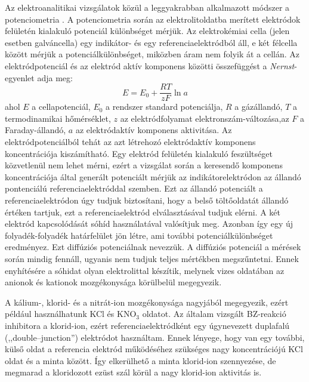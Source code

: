 Az elektroanalitikai vizsgálatok közül a leggyakrabban alkalmazott módszer a potenciometria \cite{erdey1967}. A potenciometria során az elektrolitoldatba merített elektródok felületén kialakuló potenciál különbséget mérjük. Az elektrokémiai cella (jelen esetben galváncella) egy indikátor- és egy referenciaelektródból áll, e két félcella között mérjük a potenciálkülönbséget, miközben áram nem folyik át a cellán. Az elektródpotenciál és az elektród aktív komponens közötti összefüggést a \emph{Nernst}-egyenlet adja meg:
\begin{equation}
E = E_\text{0} + \frac{RT}{zF} \ln a
\end{equation}
ahol $E$ a cellapotenciál, $E_\text{0}$ a rendszer standard potenciálja, $R$ a gázállandó, $T$ a termodinamikai hőmérséklet, $z$ az elektródfolyamat elektronszám-változása,az $F$ a Faraday-állandó, $a$ az elektródaktív komponens aktivitása.
Az elektródpotenciálból tehát az azt létrehozó elektródaktív komponens koncentrációja kiszámítható. Egy elektród felületén kialakuló feszültséget közvetlenül nem lehet mérni, ezért a vizsgálat során a keresendő komponens koncentrációja által generált potenciált mérjük az indikátorelektródon az állandó pontenciálú referenciaelektróddal szemben. Ezt az állandó potenciált a referenciaelektródon úgy tudjuk biztosítani, hogy a belső töltőoldatát állandó értéken tartjuk, ezt a referenciaelektród elválasztásával tudjuk elérni. A két elektród kapcsolódását sóhíd használatával valósítjuk meg. Azonban így egy új folyadék-folyadék határfelület jön létre, ami további potenciálkülönbséget eredményez. Ezt diffúziós potenciálnak nevezzük. A diffúziós potenciál a mérések során mindig fennáll, ugyanis nem tudjuk teljes mértékben megszűntetni. Ennek enyhítésére a sóhidat olyan elektrolittal készítik, melynek vizes oldatában az anionok és kationok mozgékonysága körülbelül megegyezik.

A kálium-, klorid- és a nitrát-ion mozgékonysága nagyjából megegyezik, ezért például használhatunk KCl és KNO$_3$ oldatot. Az általam vizsgált BZ-reakció inhibitora a klorid-ion, ezért referenciaelektródként egy úgynevezett duplafalú (,,double--junction'') elektródot használtam. Ennek lényege, hogy van egy további, külső oldat a referencia elektród működéséhez szükséges nagy koncentrációjú KCl oldat és a minta között. Így elkerülhető a minta klorid-ion szennyezése, de megmarad a kloridozott ezüst szál körül a nagy klorid-ion aktivitás is.

